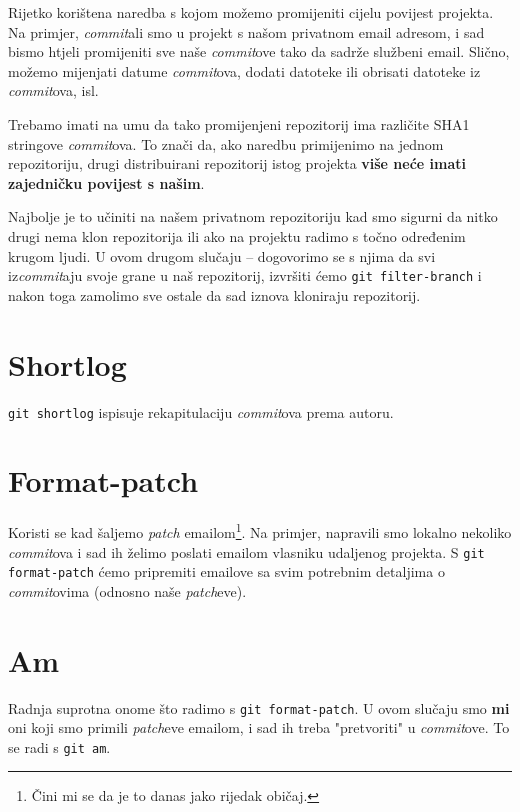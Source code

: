 Rijetko korištena naredba s kojom možemo promijeniti cijelu povijest projekta.
Na primjer, \emph{commit}ali smo u projekt s našom privatnom email adresom, i sad bismo htjeli promijeniti sve naše \emph{commit}ove tako da sadrže službeni email.
Slično, možemo mijenjati datume \emph{commit}ova, dodati datoteke ili obrisati datoteke iz \emph{commit}ova, isl.

Trebamo imati na umu da tako promijenjeni repozitorij ima različite SHA1 stringove \emph{commit}ova.
To znači da, ako naredbu primijenimo na jednom repozitoriju, drugi distribuirani repozitorij istog projekta \textbf{više neće imati zajedničku povijest s našim}.

Najbolje je to učiniti na našem privatnom repozitoriju kad smo sigurni da nitko drugi nema klon repozitorija ili ako na projektu radimo s točno određenim krugom ljudi.
U ovom drugom slučaju -- dogovorimo se s njima da svi iz\emph{commit}aju svoje grane u naš repozitorij, izvršiti ćemo \verb+git filter-branch+ i nakon toga zamolimo sve ostale da sad iznova kloniraju repozitorij.

\section*{Shortlog}

\verb+git shortlog+ ispisuje rekapitulaciju \emph{commit}ova prema autoru.

\section*{Format-patch}

Koristi se kad šaljemo \emph{patch} emailom\footnote{Čini mi se da je to danas jako rijedak običaj.}.
Na primjer, napravili smo lokalno nekoliko \emph{commit}ova i sad ih želimo poslati emailom vlasniku udaljenog projekta.
S \verb+git format-patch+ ćemo pripremiti emailove sa svim potrebnim detaljima o \emph{commit}ovima (odnosno naše \emph{patch}eve).

\section*{Am}

Radnja suprotna onome što radimo s \verb+git format-patch+.
U ovom slučaju smo \textbf{mi} oni koji smo primili \emph{patch}eve emailom, i sad ih treba "pretvoriti" u \emph{commit}ove.
To se radi s \verb+git am+.

